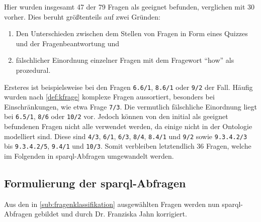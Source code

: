Hier wurden insgesamt 47 der 79 Fragen als geeignet befunden, verglichen mit 30 vorher.
Dies beruht größtenteils auf zwei Gründen:
\begin{enumerate}
  \item Den Unterschieden zwischen dem Stellen von Fragen in Form eines Quizzes und der Fragenbeantwortung und
  \item fälschlicher Einordnung einzelner Fragen mit dem Fragewort \enquote{how} als prozedural.
\end{enumerate}
Ersteres ist beispielsweise bei den Fragen \texttt{6.6/1}, \texttt{8.6/1} oder \texttt{9/2} der Fall.
Häufig wurden nach \cref{def:kfrage} komplexe Fragen aussortiert, besonders bei Einschränkungen, wie etwa Frage \texttt{7/3}.
Die vermutlich fälschliche Einordnung liegt bei \texttt{6.5/1}, \texttt{8/6} oder \texttt{10/2} vor.
Jedoch können von den initial als geeignet befundenen Fragen nicht alle verwendet werden, da einige nicht in der Ontologie modelliert sind.
Diese sind \texttt{4/3}, \texttt{6/1}, \texttt{6/3}, \texttt{8/4}, \texttt{8.4/1} und \texttt{9/2} sowie \texttt{9.3.4.2/3} bis \texttt{9.3.4.2/5}, \texttt{9.4/1} und \texttt{10/3}.
Somit verbleiben letztendlich 36 Fragen, welche im Folgenden in \ac{sparql}-Abfragen umgewandelt werden.

\subsection[Formulierung der SPARQL-Abfragen]{Formulierung der \ac{sparql}-Abfragen}

Aus den in \cref{sub:fragenklassifikation} ausgewählten Fragen werden nun \ac{sparql}-Abfragen gebildet und durch Dr. Franziska Jahn korrigiert.

